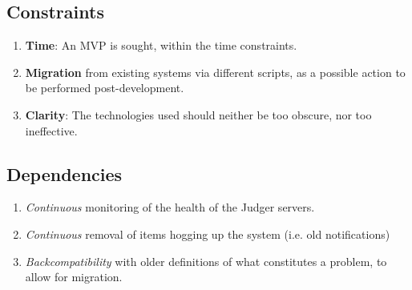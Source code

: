 \subsection{Constraints}
\begin{enumerate}
    \item \textbf{Time}: An MVP is sought, within the time constraints.
    \item \textbf{Migration} from existing systems via different scripts, as a possible action to be performed post-development.
    \item \textbf{Clarity}: The technologies used should neither be too obscure, nor too ineffective.
\end{enumerate}

\subsection{Dependencies}
\begin{enumerate}
    \item \textit{Continuous} monitoring of the health of the Judger servers.
    \item \textit{Continuous} removal of items hogging up the system (i.e. old notifications)
    \item \textit{Backcompatibility} with older definitions of what constitutes a problem, to allow for migration.
\end{enumerate}